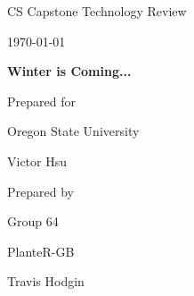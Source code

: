 \documentclass[onecolumn, draftclsnofoot,10pt, compsoc]{IEEEtran}
\def \CapstoneTeamName{			              			 PlanteR-GB}
\def \CapstoneTeamNumber{					           			 Group 64}
\def \GroupMemberOne{				           				Travis Hodgin}
\def \GroupMemberTwo{				           				Austin Hodgin}
\def \GroupMemberThree{			            Maximillian Schmidt}
\def\GroupMemberFour{		        	               Zach Lerew}
\def \CapstoneProjectName{	      	    Winter is Coming...}
\def \CapstoneSponsorCompany{		    Oregon State University}
\def \CapstoneSponsorPerson{		 			  				 Victor Hsu}
\def \DocType{		%
				Technology Review
				}
\newcommand{\NameSigPair}[1]{\par
\makebox[2.75in][r]{#1} \hfil 	\makebox[3.25in]{\makebox[2.25in]{\hrulefill} \hfill		\makebox[.75in]{\hrulefill}}
\par\vspace{-12pt} \textit{\tiny\noindent
\makebox[2.75in]{} \hfil		\makebox[3.25in]{\makebox[2.25in][r]{Signature} \hfill	\makebox[.75in][r]{Date}}}}
\renewcommand{\NameSigPair}[1]{#1}
\begin{document}
\begin{titlepage}
    \begin{singlespace}
        \hfill


        \par\vspace{.2in}
        \centering
        \scshape{
            \huge CS Capstone \DocType \par
            {\large\today}\par
            \vspace{.5in}
            \textbf{\Huge\CapstoneProjectName}\par

						\vspace{1in}

            {\large Prepared for}\par
            \Huge \CapstoneSponsorCompany\par
            \vspace{5pt}
            {\Large\NameSigPair{\CapstoneSponsorPerson}\par}

						\vspace{1in}

            {\large Prepared by}\par
						{\huge \CapstoneTeamNumber}\par
            \CapstoneTeamName\par
            \vspace{5pt}

            {
							\Large
							\NameSigPair{\GroupMemberOne}\par
            }

            \vspace{20pt}
        }
        \begin{abstract}
					\noindent The microcontroller is the brain of our project, controlling
					both our LEDs and our additional features. LEDs are the main focus
					of our project, and the way we interact between the LED and
					controller is important. In this document we will compare three
					different technologies for each of these topics, the microcontroller,
					LEDs, and LED libraries.
        \end{abstract}
    \end{singlespace}
\end{titlepage}
\end{document}
